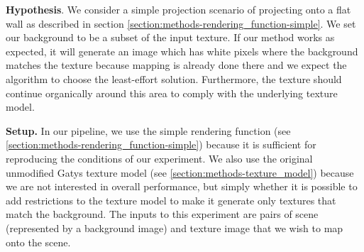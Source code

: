 \textbf{Hypothesis}. We consider a simple projection scenario of projecting onto a flat wall as described in section \ref{section:methods-rendering_function-simple}. We set our background to be a subset of the input texture. If our method works as expected, it will generate an image which has white pixels where the background matches the texture because mapping is already done there and we expect the algorithm to choose the least-effort solution. Furthermore, the texture should continue organically around this area to comply with the underlying texture model.

\textbf{Setup.} In our pipeline, we use the simple rendering function (see \ref{section:methods-rendering_function-simple}) because it is sufficient for reproducing the conditions of our experiment. We also use the original unmodified Gatys texture model (see \ref{section:methods-texture_model}) because we are not interested in overall performance, but simply whether it is possible to add restrictions to the texture model to make it generate only textures that match the background. The inputs to this experiment are pairs of scene (represented by a background image) and texture image that we wish to map onto the scene.

